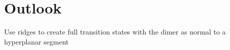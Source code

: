 \section{Outlook}
\label{sec:summary-outlook}

\bit
\item Use ridges to create full transition states with the dimer as normal to a hyperplanar segment
\eit

\placeholder
